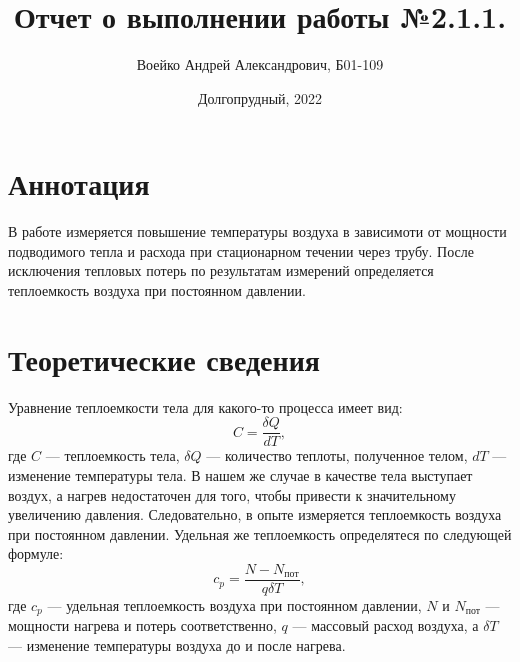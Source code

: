 \documentclass[a4paper,11pt]{article}
\title{Отчет о выполнении работы №2.1.1.}
\author{Воейко Андрей Александрович, Б01-109}
\date{Долгопрудный, 2022}
\begin{document}
\maketitle
\newpage
\section{Аннотация}
В работе измеряется повышение температуры воздуха в зависимоти от мощности подводимого тепла и расхода при стационарном течении через трубу. После исключения тепловых потерь по результатам измерений определяется теплоемкость воздуха при постоянном давлении.
\section{Теоретические сведения}
Уравнение теплоемкости тела для какого-то процесса имеет вид:
\begin{equation}    \label{eq1}
C = \frac{\delta Q}{dT},
\end{equation}
где $C$ — теплоемкость тела, $\delta Q$ — количество теплоты, полученное телом, $dT$ — изменение температуры тела.
В нашем же случае в качестве тела выступает воздух, а нагрев недостаточен для того, чтобы привести к значительному увеличению давления. Следовательно, в опыте измеряется теплоемкость воздуха при постоянном давлении.
Удельная же теплоемкость определятеся по следующей формуле:
\begin{equation}    \label{eq2}
c_{p} = \frac{N - N_{пот}}{q \delta T},
\end{equation}
где $c_{p}$ — удельная теплоемкость воздуха при постоянном давлении, $N$ и $N_{пот}$ — мощности нагрева и потерь соответственно, $q$ — массовый расход воздуха, а $\delta T$ — изменение температуры воздуха до и после нагрева.
\end{document}
